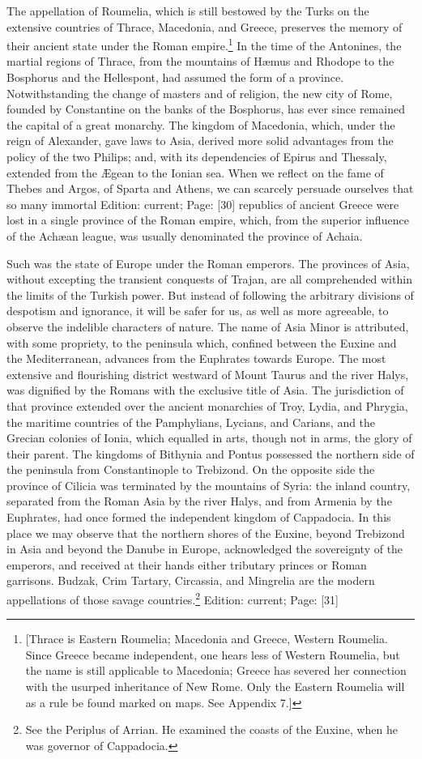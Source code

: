 The appellation of Roumelia, which is still bestowed by the Turks on the extensive countries of Thrace, Macedonia, and Greece, preserves the memory of their ancient state under the Roman empire.\footnote{[Thrace is Eastern Roumelia; Macedonia and Greece, Western Roumelia. Since Greece became independent, one hears less of Western Roumelia, but the name is still applicable to Macedonia; Greece has severed her connection with the usurped inheritance of New Rome. Only the Eastern Roumelia will as a rule be found marked on maps. See Appendix 7.]} In the time of the Antonines, the martial regions of Thrace, from the mountains of Hæmus and Rhodope to the Bosphorus and the Hellespont, had assumed the form of a province. Notwithstanding the change of masters and of religion, the new city of Rome, founded by Constantine on the banks of the Bosphorus, has ever since remained the capital of a great monarchy. The kingdom of Macedonia, which, under the reign of Alexander, gave laws to Asia, derived more solid advantages from the policy of the two Philips; and, with its dependencies of Epirus and Thessaly, extended from the Ægean to the Ionian sea. When we reflect on the fame of Thebes and Argos, of Sparta and Athens, we can scarcely persuade ourselves that so many immortal Edition: current; Page: [30] republics of ancient Greece were lost in a single province of the Roman empire, which, from the superior influence of the Achæan league, was usually denominated the province of Achaia.

Such was the state of Europe under the Roman emperors. The provinces of Asia, without excepting the transient conquests of Trajan, are all comprehended within the limits of the Turkish power. But instead of following the arbitrary divisions of despotism and ignorance, it will be safer for us, as well as more agreeable, to observe the indelible characters of nature. The name of Asia Minor is attributed, with some propriety, to the peninsula which, confined between the Euxine and the Mediterranean, advances from the Euphrates towards Europe. The most extensive and flourishing district westward of Mount Taurus and the river Halys, was dignified by the Romans with the exclusive title of Asia. The jurisdiction of that province extended over the ancient monarchies of Troy, Lydia, and Phrygia, the maritime countries of the Pamphylians, Lycians, and Carians, and the Grecian colonies of Ionia, which equalled in arts, though not in arms, the glory of their parent. The kingdoms of Bithynia and Pontus possessed the northern side of the peninsula from Constantinople to Trebizond. On the opposite side the province of Cilicia was terminated by the mountains of Syria: the inland country, separated from the Roman Asia by the river Halys, and from Armenia by the Euphrates, had once formed the independent kingdom of Cappadocia. In this place we may observe that the northern shores of the Euxine, beyond Trebizond in Asia and beyond the Danube in Europe, acknowledged the sovereignty of the emperors, and received at their hands either tributary princes or Roman garrisons. Budzak, Crim Tartary, Circassia, and Mingrelia are the modern appellations of those savage countries.\footnote{See the Periplus of Arrian. He examined the coasts of the Euxine, when he was governor of Cappadocia.}
Edition: current; Page: [31]

